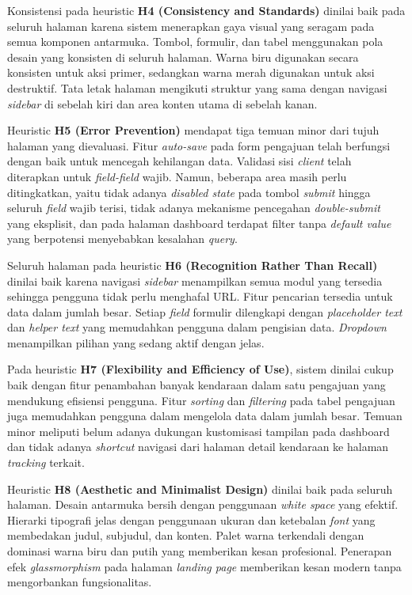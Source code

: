\documentclass[conference]{IEEEtran}
\begin{document}
Konsistensi pada heuristic \textbf{H4 (Consistency and Standards)} dinilai baik pada
seluruh halaman karena sistem menerapkan gaya visual yang seragam pada semua komponen
antarmuka. Tombol, formulir, dan tabel menggunakan pola desain yang konsisten di
seluruh halaman. Warna biru digunakan secara konsisten untuk aksi primer, sedangkan
warna merah digunakan untuk aksi destruktif. Tata letak halaman mengikuti struktur
yang sama dengan navigasi \emph{sidebar} di sebelah kiri dan area konten utama di
sebelah kanan.

Heuristic \textbf{H5 (Error Prevention)} mendapat tiga temuan minor dari tujuh halaman
yang dievaluasi. Fitur \emph{auto-save} pada form pengajuan telah berfungsi dengan
baik untuk mencegah kehilangan data. Validasi sisi \emph{client} telah diterapkan untuk
\emph{field-field} wajib. Namun, beberapa area masih perlu ditingkatkan, yaitu
tidak adanya \emph{disabled state} pada tombol \emph{submit} hingga seluruh \emph{field}
wajib terisi, tidak adanya mekanisme pencegahan \emph{double-submit} yang eksplisit,
dan pada halaman dashboard terdapat filter tanpa \emph{default value} yang berpotensi
menyebabkan kesalahan \emph{query}.

Seluruh halaman pada heuristic \textbf{H6 (Recognition Rather Than Recall)} dinilai
baik karena navigasi \emph{sidebar} menampilkan semua modul yang tersedia sehingga
pengguna tidak perlu menghafal URL. Fitur pencarian tersedia untuk data dalam jumlah
besar. Setiap \emph{field} formulir dilengkapi dengan \emph{placeholder text} dan
\emph{helper text} yang memudahkan pengguna dalam pengisian data. \emph{Dropdown}
menampilkan pilihan yang sedang aktif dengan jelas.

Pada heuristic \textbf{H7 (Flexibility and Efficiency of Use)}, sistem dinilai cukup
baik dengan fitur penambahan banyak kendaraan dalam satu pengajuan yang mendukung
efisiensi pengguna. Fitur \emph{sorting} dan \emph{filtering} pada tabel pengajuan
juga memudahkan pengguna dalam mengelola data dalam jumlah besar. Temuan minor meliputi
belum adanya dukungan kustomisasi tampilan pada dashboard dan tidak adanya
\emph{shortcut} navigasi dari halaman detail kendaraan ke halaman \emph{tracking}
terkait.

Heuristic \textbf{H8 (Aesthetic and Minimalist Design)} dinilai baik pada seluruh halaman.
Desain antarmuka bersih dengan penggunaan \emph{white space} yang efektif. Hierarki
tipografi jelas dengan penggunaan ukuran dan ketebalan \emph{font} yang membedakan
judul, subjudul, dan konten. Palet warna terkendali dengan dominasi warna biru dan putih
yang memberikan kesan profesional. Penerapan efek \emph{glassmorphism} pada halaman
\emph{landing page} memberikan kesan modern tanpa mengorbankan fungsionalitas.
\end{document}
